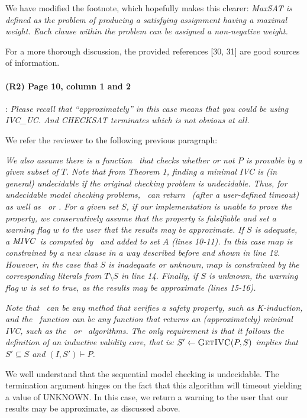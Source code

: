 \documentclass{article}
\begin{document}
\noindent We have modified the footnote, which hopefully makes this clearer:
\textit{MaxSAT is defined as the problem of producing a satisfying assignment having a maximal {\em weight}.  Each clause within the problem can be assigned a non-negative weight.}

For a more thorough discussion, the provided references [30, 31] are good sources of information.


\paragraph{(R2) Page 10, column 1 and 2}: \textit{Please recall that “approximately” in this case means that you could be using IVC\_UC.  And CHECKSAT terminates which is not obvious at all.}
\vspace{0.05in}

\noindent We refer the reviewer to the following previous paragraph:

\textit{We also assume there is a function \isadeq\ that checks whether or
not $P$ is provable by a given subset of $T$.  Note that from Theorem 1, finding a minimal IVC is (in general) undecidable if the original checking problem is undecidable.  Thus, for undecidable model checking problems, \isadeq\  can return \unknown ~(after a user-defined timeout) as well as \adequate\ or \inadequate.  For a given set $S$, if our implementation is unable to prove the property, we conservatively assume that the property is falsifiable and set a warning flag $w$ to the user that the results may be approximate.  If $S$ is adequate, a $\textit{MIVC}$~is computed by \getivc ~and added to set $A$ (lines 10-11). In this case $map$ is constrained by a new
clause in a way described before and shown in line 12.
However, in the
case that $S$ is inadequate or unknown, $map$ is constrained by the corresponding
literals from $T \setminus S$ in line 14.  Finally, if $S$ is unknown, the warning flag $w$ is set to true, as the results may be approximate (lines 15-16).}

\textit{Note that \isadeq ~can be any method that verifies a safety property, such as K-induction, and the \getivc\ function can be any function that returns an (approximately) minimal IVC, such as the \ucalg\ or \ucbfalg\ algorithms. The only requirement is that it follows the definition of an inductive validity core, that is: $S' \leftarrow \textsc{GetIVC} (P, S)$ implies that $S' \subseteq S$ and $(I, S') \vdash P$.}

We well understand that the sequential model checking is undecidable.  The termination argument hinges on the fact that this algorithm will timeout yielding a value of UNKNOWN.  In this case, we return a warning to the user that our results may be approximate, as discussed above.
\end{document}

